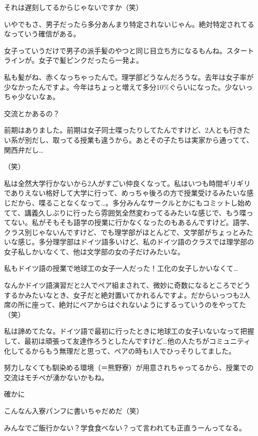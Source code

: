 \begin{multicols}{2}
  それは遅刻してるからじゃないですか（笑）

  いやでもさ、男子だったら多分あんまり特定されないじゃん。絶対特定されてるなっていう確信がある。

  女子っていうだけで男子の派手髪のやつと同じ目立ち方になるもんね。スタートラインが。女子で髪ピンクだったら一発よ。

  私も髪がね、赤くなっちゃったんで。理学部どうなんだろうな。去年は女子率が少なかったんですよ。今年はちょっと増えて多分10\%ぐらいになった。少ないっちゃ少ないなぁ。

  交流とかあるの？

  前期はありました。前期は女子同士喋ったりしてたんですけど、2人とも行きたい系が別だし、取ってる授業も違うから。あとその子たちは実家から通ってて、関西弁だし…

  （笑）

  私は全然大学行かないから2人がすごい仲良くなって。私はいつも時間ギリギリでありえない格好して大学に行って、めっちゃ後ろの方で授業受けるみたいな感じだから、喋ることなくなって…。多分みんなサークルとかにもコミットし始めてて、講義久しぶりに行ったら雰囲気全然変わってるみたいな感じで、もう喋ってない。私がそもそも語学の授業に行かなくなったのもあるんですけど。語学、クラス別じゃないんですけど、でも理学部がほとんどで、文学部がちょっとみたいな感じ。多分理学部はドイツ語多いけど、私のドイツ語のクラスでは理学部の女子私しかいなくて、他は文学部の女の子だけみたいな。

  私もドイツ語の授業で地球工の女子一人だった！工化の女子しかいなくて…

  なんかドイツ語演習だと2人でペア組まされて、微妙に奇数になるところでどうするかみたいなとき、女子だと絶対置いてかれるんですよ。だからいっつも2人席の所に座って、絶対にペアからはぐれないようにするっていうのをやってた（笑）

  私は諦めてたな。ドイツ語で最初に行ったときに地球工の女子いないなって把握して、最初は頑張って友達作ろうとしたんですけど…他の人たちがコミュニティ化してるからもう無理だと思って、ペアの時も1人でひっそりしてました。

  努力しなくても馴染める環境（＝熊野寮）が用意されちゃってるから、授業での交流はモチベが湧かないかもね。

  確かに

  こんなん入寮パンフに書いちゃだめだ（笑）

  みんなでご飯行かない？学食食べない？って言われても正直うーんってなる。


\end{multicols}
